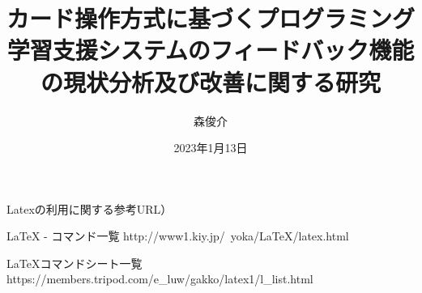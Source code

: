 \documentclass[gaiyou]{hitsotsuron} %
\title{カード操作方式に基づくプログラミング学習支援システムのフィードバック機能の現状分析及び改善に関する研究}
\author{森俊介}
\date{2023年1月13日}
\begin{document}

\twocolumn[%
\maketitle
]


Latexの利用に関する参考URL）

LaTeX - コマンド一覧
http://www1.kiy.jp/~yoka/LaTeX/latex.html

LaTeXコマンドシート一覧
https://members.tripod.com/e_luw/gakko/latex1/l_list.html

\fi











\end{document}
